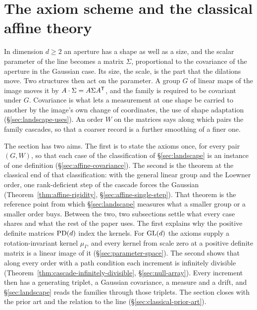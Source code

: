 %

\section{The axiom scheme and the classical affine theory}\label{sec:classical}

In dimension $d \ge 2$ an aperture has a shape as well as a size, and the scalar parameter of the
line becomes a matrix $\Sigma$, proportional to the covariance of the aperture in the Gaussian case.
Its size, the scale, is the part that the dilations move. Two
structures then act on the parameter. A group $G$ of linear maps of the image moves it by
$A \cdot \Sigma = A\Sigma A^{\mathsf{T}}$, and the family is required to be covariant under $G$. Covariance is
what lets a measurement at one shape be carried to another by the image's own change of
coordinates, the use of shape adaptation (\S\ref{sec:landscape-uses}). An order $W$ on the matrices says
along which pairs the family cascades, so that a coarser record is a further smoothing of a finer
one.

The section has two aims. The first is to state the axioms once, for every pair $(G, W)$, so that
each case of the classification of \S\ref{sec:landscape} is an instance of one definition
(\S\ref{sec:affine-covariance}). The second is the theorem at the classical end of that
classification: with the general linear group and the Loewner order, one rank-deficient step of the
cascade forces the Gaussian (Theorem~\ref{thm:affine-rigidity}, \S\ref{sec:affine-single-step}). That
theorem is the reference point from which \S\ref{sec:landscape} measures what a smaller group or a
smaller order buys. Between the two, two subsections settle what every case shares and what the
rest of the paper uses. The first explains why the positive definite matrices $\mathrm{PD}(d)$ index the
kernels. For $\mathrm{GL}(d)$ the axioms supply a rotation-invariant kernel $\mu_I$, and every kernel from
scale zero at a positive definite matrix is a linear image of it (\S\ref{sec:parameter-space}). The second shows that along every order with a path
condition each increment is infinitely divisible (Theorem~\ref{thm:cascade-infinitely-divisible},
\S\ref{sec:null-array}). Every increment then has a generating triplet, a Gaussian covariance, a
\Levy{} measure and a drift, and \S\ref{sec:landscape} reads the families through those triplets.
The section closes with the prior art and the relation to the line (\S\ref{sec:classical-prior-art}).

